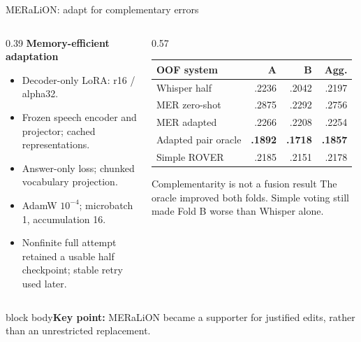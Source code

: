\documentclass[aspectratio=169,11pt]{beamer}
\newcommand{\takeaway}[1]{\vfill\begin{beamercolorbox}[sep=2mm,wd=\linewidth]{block body}\small\textbf{Key point:} #1\end{beamercolorbox}}
\begin{document}
\begin{frame}{MERaLiON: adapt for complementary errors}
\begin{columns}[T]
\begin{column}{0.39\textwidth}
\textbf{Memory-efficient adaptation}
\small\begin{itemize}\item Decoder-only LoRA: r16 / alpha32.
\item Frozen speech encoder and projector; cached representations.
\item Answer-only loss; chunked vocabulary projection.
\item AdamW $10^{-4}$; microbatch 1, accumulation 16.
\item Nonfinite full attempt retained a usable half checkpoint; stable retry used later.
\end{itemize}
\end{column}
\begin{column}{0.57\textwidth}
\small
\begin{tabular}{@{}lrrr@{}}\toprule
\textbf{OOF system}&\textbf{A}&\textbf{B}&\textbf{Agg.}\\\midrule
Whisper half&.2236&.2042&.2197\\
MER zero-shot&.2875&.2292&.2756\\
MER adapted&.2266&.2208&.2254\\
Adapted pair oracle&\textbf{.1892}&\textbf{.1718}&\textbf{.1857}\\
Simple ROVER&.2185&.2151&.2178\\\bottomrule
\end{tabular}
\vspace{4mm}\par
\begin{alertblock}{Complementarity is not a fusion result}
The oracle improved both folds. Simple voting still made Fold B worse than Whisper alone.
\end{alertblock}
\end{column}
\end{columns}
\takeaway{MERaLiON became a supporter for justified edits, rather than an unrestricted replacement.}
\end{frame}
\end{document}
